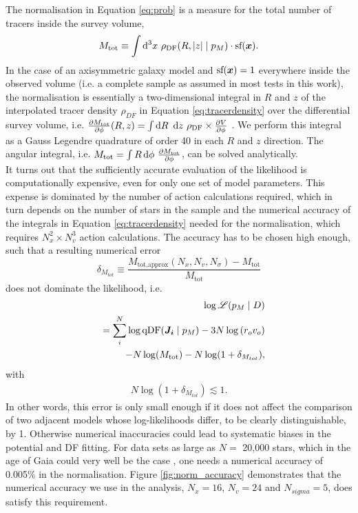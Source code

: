 The normalisation in Equation \ref{eq:prob} is a measure for the total number of tracers inside the survey volume,
\begin{equation}
M_\text{tot} \equiv \int \mathop{}\!\mathrm{d^3} x \  \rho_\text{DF}(R,|z| \mid p_M) \cdot \text{sf}(\boldsymbol{x}).\label{eq:normalisation}
\end{equation}
In the case of an axisymmetric galaxy model and $\text{sf}(\boldsymbol{x})=1$ everywhere inside the observed volume (i.e. a complete sample as assumed in most tests in this work), the normalisation is essentially a two-dimensional integral in $R$ and $z$ of the interpolated tracer density $\rho_{DF}$ in Equation \ref{eq:tracerdensity} over the differential survey volume, i.e. $\frac{\partial M_\text{tot}}{\partial \phi} (R,z) = \int \mathop{}\!\mathrm{d} R \ \mathop{}\!\mathrm{d} z \ \rho_\text{DF} \times \frac{\partial V}{\partial \phi}$ . We perform this integral as a Gauss Legendre quadrature of order 40 in each $R$ and $z$ direction. The angular integral, i.e. $M_\text{tot} = \int R \mathop{}\!\mathrm{d} \phi \ \frac{\partial M_\text{tot}}{\partial \phi}$, can be solved analytically. 
\\It turns out that the sufficiently accurate evaluation of the likelihood is computationally expensive, even for only one set of model parameters. This expense is dominated by the number of action calculations required, which in turn depends on the number of stars in the sample and the numerical accuracy of the integrals in Equation \ref{eq:tracerdensity} needed for the normalisation, which requires $N_x^2 \times N_v^3$ action calculations. The accuracy has to be chosen high enough, such that a resulting numerical error 
\begin{equation}
\delta_{M_{tot}} \equiv \frac{M_\text{tot,approx}(N_x,N_v,N_\sigma) -  M_\text{tot} }{M_\text{tot}}\label{eq:relerrlikelihood}
\end{equation}
does not dominate the likelihood, i.e.
\begin{eqnarray}
& &\log \mathscr{L}(p_M \mid D) \nonumber\\
&& = \sum_i^{N} \log \text{qDF}(\boldsymbol{J_i} \mid p_M) - 3N \log \left( r_o v_o\right)\nonumber\\
& & -N \log(M_\text{tot}) - N \log (1 + \delta_{M_{tot}}),\label{eq:loglikelihood_relerr}
\end{eqnarray}
with
\begin{eqnarray}
N \log (1 + \delta_{M_{tot}}) \lesssim 1.\nonumber
\end{eqnarray}
In other words, this error is only small enough if it does not affect the comparison of two adjacent models whose log-likelihoods differ, to be clearly distinguishable, by 1. Otherwise numerical inaccuracies could lead to systematic biases in the potential and DF fitting. For data sets as large as $N =$ 20,000 stars, which in the age of Gaia could very well be the case \HW{[TO DO: Really???]}, one needs a numerical accuracy of 0.005\% in the normalisation. Figure \ref{fig:norm_accuracy} demonstrates that the numerical accuracy we use in the analysis, $N_x=16$, $N_v=24$ and $N_{sigma}=5$, does satisfy this requirement.\\

